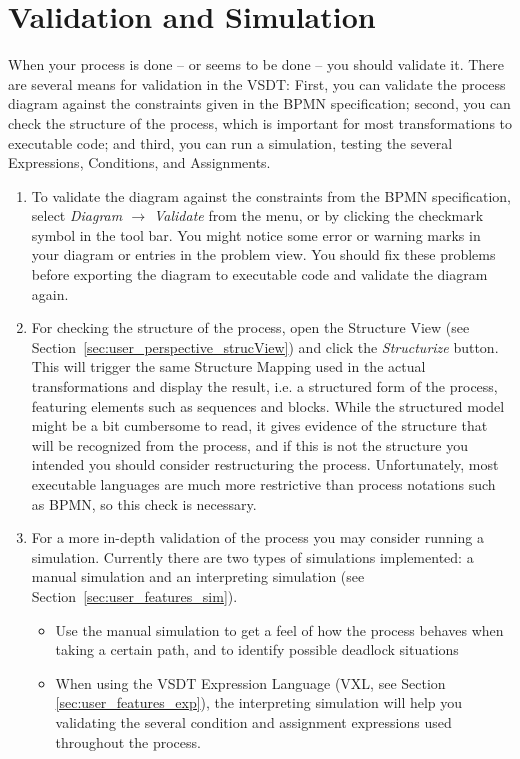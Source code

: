 \section{Validation and Simulation}
\label{sec:user_tut_validation}

When your process is done -- or seems to be done -- you should validate it.  There
are several means for validation in the VSDT: First, you can validate the process
diagram against the constraints given in the BPMN specification; second, you can
check the structure of the process, which is important for most transformations
to executable code; and third, you can run a simulation, testing the several
Expressions, Conditions, and Assignments.

\begin{enumerate}

	\item To validate the diagram against the constraints from the BPMN
	specification, select \emph{Diagram $\rightarrow$ Validate} from the menu, or
	by clicking the checkmark symbol in the tool bar.  You might notice some error
	or warning marks in your diagram or entries in the problem view.  You should
	fix these problems before exporting the diagram to executable code and validate
	the diagram again.
	
	\item For checking the structure of the process, open the Structure View (see
	Section~\ref{sec:user_perspective_strucView}) and click the \emph{Structurize}
	button.  This will trigger the same Structure Mapping used in the actual
	transformations and display the result, i.e. a structured form of the process,
	featuring elements such as sequences and blocks.  While the structured model
	might be a bit cumbersome to read, it gives evidence of the structure that
	will be recognized from the process, and if this is not the structure you
	intended you should consider restructuring the process.  Unfortunately, most
	executable languages are much more restrictive than process notations such as
	BPMN, so this check is necessary.
	
	\item For a more in-depth validation of the process you may consider running
	a simulation.  Currently there are two types of simulations implemented: a
	manual simulation and an interpreting simulation (see
	Section~\ref{sec:user_features_sim}).
	\begin{itemize}
		\item Use the manual simulation to get a feel of how the process behaves
		when taking a certain path, and to identify possible deadlock situations
		
		\item When using the VSDT Expression Language (VXL, see Section
		\ref{sec:user_features_exp}), the interpreting simulation will help you
		validating the several condition and assignment expressions used throughout
		the process.
	\end{itemize}

\end{enumerate}


